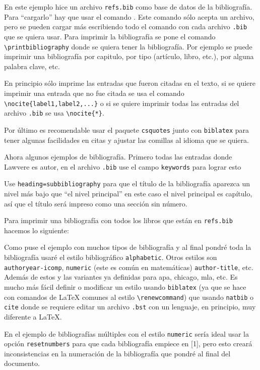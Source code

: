 En este ejemplo hice un archivo \texttt{refs.bib} como base de datos de la
bibliografía. Para ``cargarlo'' hay que usar el comando
\verb||. Este comando sólo acepta un archivo, pero
se pueden cargar más escribiendo todo el comando con cada archivo
\texttt{.bib} que se quiera usar. Para imprimir la bibliografía se pone el
comando \verb|\printbibliography| donde se quiera tener la bibliografía. Por
ejemplo se puede imprimir una bibliografía por capitulo, por tipo
(artículo, libro, etc.), por alguna palabra clave, etc.

En principio sólo imprime las entradas que fueron citadas en el texto, si se
quiere imprimir una entrada que no fue citada se usa el comando
\verb|\nocite{label1,label2,...}| o si se quiere imprimir todas las entradas
del archivo \texttt{.bib} se usa \verb|\nocite{*}|.

Por último es recomendable usar el paquete \texttt{csquotes} junto con
\texttt{biblatex} para tener algunas facilidades en citas y ajustar las
comillas al idioma que se quiera.

Ahora algunos ejemplos de bibliografía. Primero todas las entradas donde
Lawvere es autor, en el archivo \texttt{.bib} use el campo \texttt{keywords}
para lograr esto
\nocite{*}
\printbibliography[keyword=Lawvere,heading=subbibliography,title=Lawvere]

Use \texttt{heading=subbibliography} para que el título de la bibliografía
aparezca un nivel más bajo que ``el nivel principal'' en este caso el nivel
principal es capítulo, así que el título será impreso como una sección sin
número.

Para imprimir una bibliografía con todos los libros que están en
\texttt{refs.bib} hacemos lo siguiente:
\printbibliography[type=book,heading=subbibliography,title=Libros]

Como puse el ejemplo con muchos tipos de bibliografía y al final pondré toda
la bibliografía usaré el estilo bibliográfico \texttt{alphabetic}.
Otros estilos son \texttt{authoryear-icomp}, \texttt{numeric} (este es común
en matemáticas) \texttt{author-title}, etc. Además de estos y las variantes
ya definidas para apa, chicago, mla, etc. Es mucho más fácil definir o
modificar un estilo usando \texttt{biblatex} (ya que se hace con comandos de
\LaTeX{} comunes al estilo \verb|\renewcommand|) que usando \texttt{natbib}
o \texttt{cite} donde se requiere editar un archivo \texttt{.bst} con un
lenguaje, en principio, muy diferente a \LaTeX.

En el ejemplo de bibliografías múltiples con el estilo \texttt{numeric}
sería ideal usar la opción \texttt{resetnumbers} para que cada bibliografía
empiece en [1], pero esto creará inconsistencias en la numeración de la
bibliografía que pondré al final del documento.

